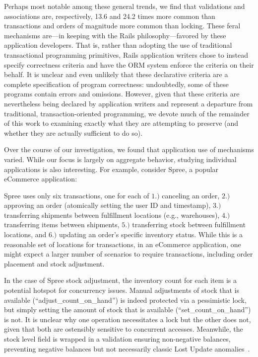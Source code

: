 Perhaps most notable among these general trends, we find that
validations and associations are, respectively, 13.6 and 24.2 times
more common than transactions and orders of magnitude more common than
locking. These feral mechanisms are---in keeping with the Rails
philosophy---favored by these application developers. That is, rather
than adopting the use of traditional transactional programming
primitives, Rails application writers chose to instead specify
correctness criteria and have the ORM system enforce the criteria on
their behalf. It is unclear and even unlikely that these declarative
criteria are a complete specification of program correctness:
undoubtedly, some of these programs contain errors and omissions. However, given
that these criteria are nevertheless being declared by application
writers and represent a departure from traditional,
transaction-oriented programming, we devote much of the remainder of
this work to examining exactly what they are attempting to preserve
(and whether they are actually sufficient to do so).

 Over the course of our
investigation, we found that application use of mechanisms
varied. While our focus is largely on aggregate behavior, studying
individual applications is also interesting. For example, consider
Spree, a popular eCommerce application:

Spree uses only six transactions, one for each of $1.)$ canceling an
order, $2.)$ approving an order (atomically setting the user ID and
timestamp), $3.)$ transferring shipments between fulfillment locations
(e.g., warehouses), $4.)$ transferring items between shipments, $5.)$
transferring stock between fulfillment locations, and $6.)$ updating an
order's specific inventory status. While this is a reasonable set of
locations for transactions, in an eCommerce application, one might
expect a larger number of scenarios to require transactions, including
order placement and stock adjustment.

In the case of Spree stock adjustment, the inventory count for each
item is a potential hotspot for concurrency issues. Manual adjustments
of stock that is available (``adjust\_count\_on\_hand'') is indeed
protected via a pessimistic lock, but simply setting the amount of
stock that is available (``set\_count\_on\_hand'') is not. It is
unclear why one operation necessitates a lock but the other does not,
given that both are ostensibly sensitive to concurrent
accesses. Meanwhile, the stock level field is wrapped in a validation
ensuring non-negative balances, preventing negative balances but not
necessarily classic Lost Update anomalies~\cite{adya}.

